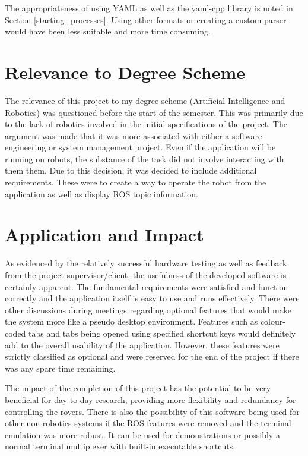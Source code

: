 The appropriateness of using YAML as well as the yaml-cpp library is noted in Section \ref{starting_processes}. Using other formats or creating a custom parser would have been less suitable and more time consuming.

\section{Relevance to Degree Scheme}

The relevance of this project to my degree scheme (Artificial Intelligence and Robotics) was questioned before the start of the semester. This was primarily due to the lack of robotics involved in the initial specifications of the project. The argument was made that it was more associated with either a software engineering or system management project. Even if the application will be running on robots, the substance of the task did not involve interacting with them them. Due to this decision, it was decided to include additional requirements. These were to create a way to operate the robot from the application as well as display ROS topic information.

\section{Application and Impact}
\label{application}

As evidenced by the relatively successful hardware testing as well as feedback from the project supervisor/client, the usefulness of the developed software is certainly apparent. The fundamental requirements were satisfied and function correctly and the application itself is easy to use and runs effectively. There were other discussions during meetings regarding optional features that would make the system more like a pseudo desktop environment. Features such as colour-coded tabs and tabs being opened using specified shortcut keys would definitely add to the overall usability of the application. However, these features were strictly classified as optional and were reserved for the end of the project if there was any spare time remaining.

The impact of the completion of this project has the potential to be very beneficial for day-to-day research, providing more flexibility and redundancy for controlling the rovers. There is also the possibility of this software being used for other non-robotics systems if the ROS features were removed and the terminal emulation was more robust. It can be used for demonstrations or possibly a normal terminal multiplexer with built-in executable shortcuts.

